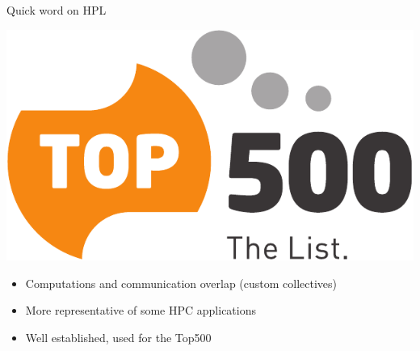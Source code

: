 \documentclass[10pt]{beamer}
\begin{document}
\begin{frame}[fragile]{Quick word on HPL}
    \begin{minipage}[b][0.2\textheight][c]{.2\linewidth}
        \includegraphics[width=\linewidth]{img/slides/top_500.pdf}
    \end{minipage} \hfill %
    \begin{minipage}[b][0.25\textheight][t]{0.78\linewidth}
        \begin{itemize}
            \item Computations and communication overlap (custom collectives)
            \item More representative of some HPC applications
            \item Well established, used for the Top500
        \end{itemize}
    \end{minipage}
    \vfill
    \pause


\end{frame}
\end{document}

